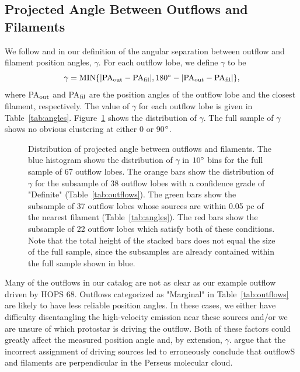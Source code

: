 \documentclass[twocolumn]{aastex63}
\newcommand{\nlobes}{67}
\newcommand{\example}{HOPS 68}
\begin{document}
\subsection{Projected Angle Between Outflows and Filaments}\label{sec:gamma}

We follow \citet{Stephens17} and \citet{Kong19} in our definition of the angular separation between outflow and filament position angles, $\gamma$. For each outflow lobe, we define $\gamma$ to be 
\begin{equation}
    \gamma = \rm{MIN}\{|\rm{PA}_{\rm out} - \rm{PA}_{\rm fil}|, 180\degr - |\rm{PA}_{\rm out} - \rm{PA}_{\rm fil}|\},
\end{equation}
where PA$_{\rm out}$ and PA$_{\rm fil}$ are the position angles of the outflow lobe and the closest filament, respectively. The value of $\gamma$ for each outflow lobe is given in Table~\ref{tab:angles}. Figure~\ref{fig:gamma_hist} shows the distribution of $\gamma$. The full sample of $\gamma$ shows no obvious clustering at either 0 or 90$\mbox{$^\circ$}$.

\begin{figure}
\caption{Distribution of projected angle between outflows and filaments. The blue histogram shows the distribution of $\gamma$ in $10\mbox{$^\circ$}$ bins for the full sample of \nlobes{} outflow lobes. The orange bars show the distribution of $\gamma$ for the subsample of 38 outflow lobes with a confidence grade of "Definite" (Table~\ref{tab:outflows}). The green bars show the subsample of 37 outflow lobes whose sources are within 0.05 pc of the nearest filament (Table~\ref{tab:angles}). The red bars show the subsample of 22 outflow lobes which satisfy both of these conditions. Note that the total height of the stacked bars does not equal the size of the full sample, since the subsamples are already contained within the full sample shown in blue. \label{fig:gamma_hist}}
\end{figure}

Many of the outflows in our catalog are not as clear as our example outflow driven by \example{}. Outflows categorized as "Marginal" in Table~\ref{tab:outflows} are likely to have less reliable position angles. In these cases, we either have difficulty disentangling the high-velocity emission near these sources and/or we are unsure of which protostar is driving the outflow. Both of these factors could greatly affect the measured position angle and, by extension, $\gamma$. \citet{Stephens17} argue that the incorrect assignment of driving sources led \citet{Anathpindika08} to erroneously conclude that outflowS and filaments are perpendicular in the Perseus molecular cloud.
\end{document}
